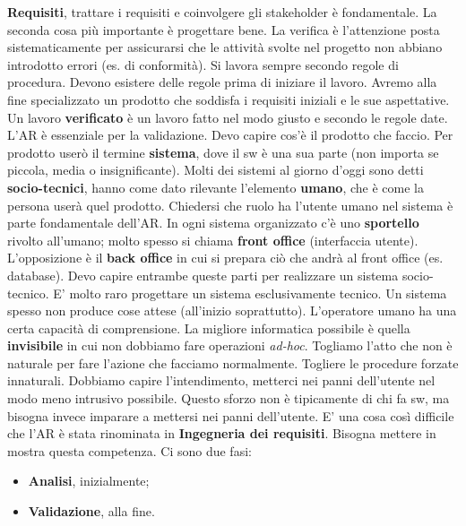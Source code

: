 \textbf{Requisiti}, trattare i requisiti e coinvolgere gli stakeholder è fondamentale. La seconda cosa più importante è progettare bene. La verifica è l'attenzione posta sistematicamente per assicurarsi che le attività svolte nel progetto non abbiano introdotto errori (es. di conformità). Si lavora sempre secondo regole di procedura. Devono esistere delle regole prima di iniziare il lavoro. Avremo alla fine specializzato un prodotto che soddisfa i requisiti iniziali e le sue aspettative. Un lavoro \textbf{verificato} è un lavoro fatto nel modo giusto e secondo le regole date. L'AR è essenziale per la validazione. Devo capire cos'è il prodotto che faccio. Per prodotto userò il termine \textbf{sistema}, dove il sw è una sua parte (non importa se piccola, media o insignificante). Molti dei sistemi al giorno d'oggi sono detti \textbf{socio-tecnici}, hanno come dato rilevante l'elemento \textbf{umano}, che è come la persona userà quel prodotto. Chiedersi che ruolo ha l'utente umano nel sistema è parte fondamentale dell'AR. In ogni sistema organizzato c'è uno \textbf{sportello} rivolto all'umano; molto spesso si chiama \textbf{front office} (interfaccia utente). L'opposizione è il \textbf{back office} in cui si prepara ciò che andrà al front office (es. database). Devo capire entrambe queste parti per realizzare un sistema socio-tecnico. E' molto raro progettare un sistema esclusivamente tecnico. Un sistema spesso non produce cose attese (all'inizio soprattutto). L'operatore umano ha una certa capacità di comprensione. La migliore informatica possibile è quella \textbf{invisibile} in cui non dobbiamo fare operazioni \textit{ad-hoc}. Togliamo l'atto che non è naturale per fare l'azione che facciamo normalmente. Togliere le procedure forzate innaturali. Dobbiamo capire l'intendimento, metterci nei panni dell'utente nel modo meno intrusivo possibile. Questo sforzo non è tipicamente di chi fa sw, ma bisogna invece imparare a mettersi nei panni dell'utente. E' una cosa così difficile che l'AR è stata rinominata in \textbf{Ingegneria dei requisiti}. Bisogna mettere in mostra questa competenza. Ci sono due fasi:

\begin{itemize}

	\item \textbf{Analisi}, inizialmente;
	\item \textbf{Validazione}, alla fine.

\end{itemize}

